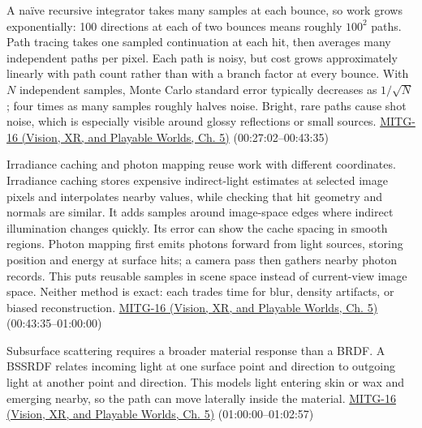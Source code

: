 A naïve recursive integrator takes many samples at each bounce, so work grows exponentially: 100 directions at each of two bounces means roughly \(100^2\) paths. Path tracing takes one sampled continuation at each hit, then averages many independent paths per pixel. Each path is noisy, but cost grows approximately linearly with path count rather than with a branch factor at every bounce. With \(N\) independent samples, Monte Carlo standard error typically decreases as \(1/\sqrt{N}\); four times as many samples roughly halves noise. Bright, rare paths cause shot noise, which is especially visible around glossy reflections or small sources. \href{../07-Vision-XR-and-Playable-Worlds/main.pdf\#nameddest=04-visual-computing-ii-ch036-mitg-16---global-illumination}{MITG-16 (Vision, XR, and Playable Worlds, Ch. 5)} (00:27:02--00:43:35)

Irradiance caching and photon mapping reuse work with different coordinates. Irradiance caching stores expensive indirect-light estimates at selected image pixels and interpolates nearby values, while checking that hit geometry and normals are similar. It adds samples around image-space edges where indirect illumination changes quickly. Its error can show the cache spacing in smooth regions. Photon mapping first emits photons forward from light sources, storing position and energy at surface hits; a camera pass then gathers nearby photon records. This puts reusable samples in scene space instead of current-view image space. Neither method is exact: each trades time for blur, density artifacts, or biased reconstruction. \href{../07-Vision-XR-and-Playable-Worlds/main.pdf\#nameddest=04-visual-computing-ii-ch036-mitg-16---global-illumination}{MITG-16 (Vision, XR, and Playable Worlds, Ch. 5)} (00:43:35--01:00:00)

Subsurface scattering requires a broader material response than a BRDF. A BSSRDF relates incoming light at one surface point and direction to outgoing light at another point and direction. This models light entering skin or wax and emerging nearby, so the path can move laterally inside the material. \href{../07-Vision-XR-and-Playable-Worlds/main.pdf\#nameddest=04-visual-computing-ii-ch036-mitg-16---global-illumination}{MITG-16 (Vision, XR, and Playable Worlds, Ch. 5)} (01:00:00--01:02:57)

